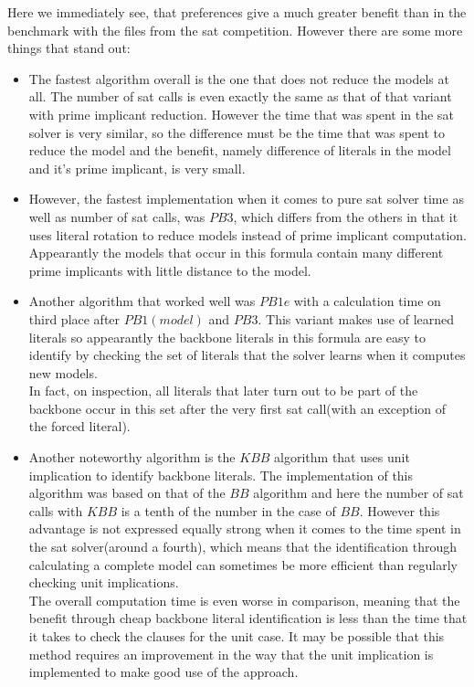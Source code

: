 Here we immediately see, that preferences give a much greater benefit than in the benchmark with the files from the sat competition. However there are some more things that stand out:
\begin{itemize}
\item The fastest algorithm overall is the one that does not reduce the models at all. The number of sat calls is even exactly the same as that of that variant with prime implicant reduction. However the time that was spent in the sat solver is very similar, so the difference must be the time that was spent to reduce the model and the benefit, namely difference of literals in the model and it's prime implicant, is very small.
\item However, the fastest implementation when it comes to pure sat solver time as well as number of sat calls, was $PB3$, which differs from the others in that it uses literal rotation to reduce models instead of prime implicant computation. Appearantly the models that occur in this formula contain many different prime implicants with little distance to the model.
\item Another algorithm that worked well was $PB1e$ with a calculation time on third place after $PB1(model)$ and $PB3$. This variant makes use of learned literals so appearantly the backbone literals in this formula are easy to identify by checking the set of literals that the solver learns when it computes new models.\\
In fact, on inspection, all literals that later turn out to be part of the backbone occur in this set after the very first sat call(with an exception of the forced literal).
\item Another noteworthy algorithm is the $KBB$ algorithm that uses unit implication to identify backbone literals. The implementation of this algorithm was based on that of the $BB$ algorithm and here the number of sat calls with $KBB$ is a tenth of the number in the case of $BB$. However this advantage is not expressed equally strong when it comes to the time spent in the sat solver(around a fourth), which means that the identification through calculating a complete model can sometimes be more efficient than regularly checking unit implications.\\
The overall computation time is even worse in comparison, meaning that the benefit through cheap backbone literal identification is less than the time that it takes to check the clauses for the unit case. It may be possible that this method requires an improvement in the way that the unit implication is implemented to make good use of the approach.
\end{itemize}

